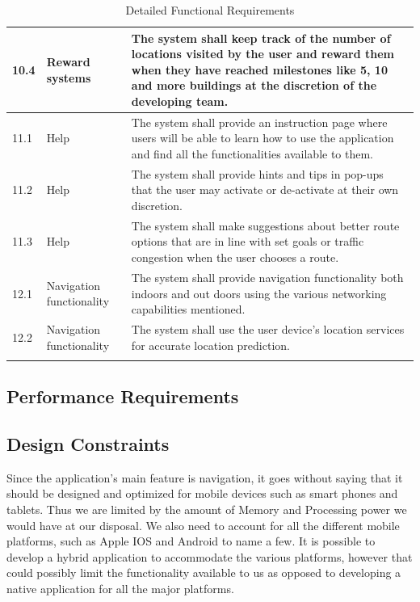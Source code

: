 \documentclass[12pt]{article}
\begin{document}
\begin{longtable}{|p{}| p{} | p{} |}
\hline

10.4& Reward systems& The system  shall keep track of the number of locations visited by the user and reward them when they have reached milestones like 5, 10 and more buildings at the discretion of the developing team.\\

\hline

11.1& Help &The system shall provide an instruction page where users will be able to learn how to use the application and find all the functionalities available to them.\\

\hline

11.2& Help& The system shall provide hints and tips in pop-ups that the user may activate or de-activate at their own discretion.\\

\hline

11.3& Help& The system shall make suggestions about better route options that are in line with set goals or traffic congestion when the user chooses a route.\\

\hline

12.1 &Navigation functionality & The system shall provide navigation functionality both indoors and out doors using the various networking capabilities mentioned.\\

\hline

12.2&Navigation functionality &The system shall use the user device's location services for accurate location prediction.\\

\hline





\caption{Detailed Functional Requirements} %

\label{tab:NavUP Functional Requirements}

	
	\end{longtable}
	
	\subsection{Performance Requirements}
	
	\subsection{Design Constraints}
	Since the application's main feature is navigation, it goes without saying that it should be designed and optimized for mobile devices such as smart phones and tablets.  Thus we are limited by the amount of Memory and Processing power we would have at our disposal.  We also need to account for all the different mobile platforms, such as Apple IOS and Android to name a few.  It is possible to develop a hybrid application to accommodate the various platforms, however that could possibly limit the functionality available to us as opposed to developing a native application for all the major platforms.  
	
\end{document}
